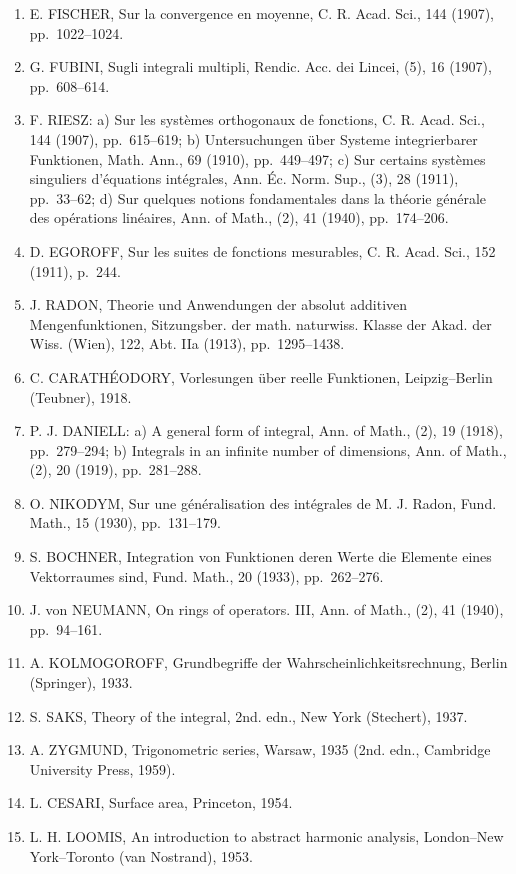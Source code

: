 \begin{enumerate}
\item
  E. FISCHER, Sur la convergence en moyenne, C. R. Acad. Sci., 144 (1907), pp.~1022--1024.
\item
  G. FUBINI, Sugli integrali multipli, Rendic. Acc. dei Lincei, (5), 16 (1907), pp.~608--614.
\item
  F. RIESZ: a) Sur les systèmes orthogonaux de fonctions, C. R. Acad. Sci., 144 (1907), pp.~615--619; b) Untersuchungen über Systeme integrierbarer Funktionen, Math. Ann., 69 (1910), pp.~449--497; c) Sur certains systèmes singuliers d'équations intégrales, Ann. Éc. Norm. Sup., (3), 28 (1911), pp.~33--62; d) Sur quelques notions fondamentales dans la théorie générale des opérations linéaires, Ann. of Math., (2), 41 (1940), pp.~174--206.
\item
  D. EGOROFF, Sur les suites de fonctions mesurables, C. R. Acad. Sci., 152 (1911), p.~244.
\item
  J. RADON, Theorie und Anwendungen der absolut additiven Mengenfunktionen, Sitzungsber. der math. naturwiss. Klasse der Akad. der Wiss. (Wien), 122, Abt. IIa (1913), pp.~1295--1438.
\item
  C. CARATHÉODORY, Vorlesungen über reelle Funktionen, Leipzig--Berlin (Teubner), 1918.
\item
  P. J. DANIELL: a) A general form of integral, Ann. of Math., (2), 19 (1918), pp.~279--294; b) Integrals in an infinite number of dimensions, Ann. of Math., (2), 20 (1919), pp.~281--288.
\item
  O. NIKODYM, Sur une généralisation des intégrales de M. J. Radon, Fund. Math., 15 (1930), pp.~131--179.
\item
  S. BOCHNER, Integration von Funktionen deren Werte die Elemente eines Vektorraumes sind, Fund. Math., 20 (1933), pp.~262--276.
\item
  J. von NEUMANN, On rings of operators. III, Ann. of Math., (2), 41 (1940), pp.~94--161.
\item
  A. KOLMOGOROFF, Grundbegriffe der Wahrscheinlichkeitsrechnung, Berlin (Springer), 1933.
\item
  S. SAKS, Theory of the integral, 2nd. edn., New York (Stechert), 1937.
\item
  A. ZYGMUND, Trigonometric series, Warsaw, 1935 (2nd. edn., Cambridge University Press, 1959).
\item
  L. CESARI, Surface area, Princeton, 1954.
\item
  L. H. LOOMIS, An introduction to abstract harmonic analysis, London--New York--Toronto (van Nostrand), 1953.
\end{enumerate}

